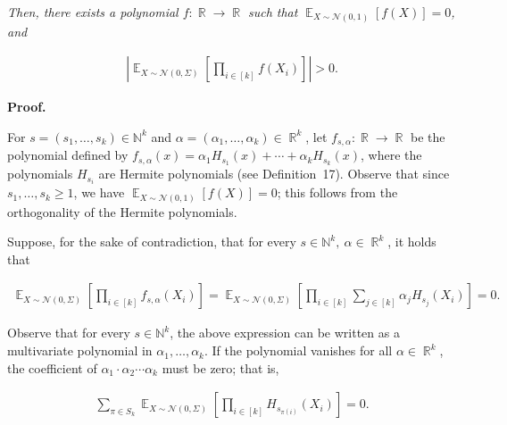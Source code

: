 \emph{Then, there exists a polynomial $f:\mathop{\mathbb{R}}\to\mathop{\mathbb{R}}$ such that $\mathop{\mathbb{E}}_{X\sim\mathcal{N}(0,1)}\left[f(X)\right]=0$, and}\par


\[\begin{gathered}
\left|\mathop{\mathbb{E}}_{X\sim\mathcal{N}(0,\Sigma)}\left[\prod_{i\in[k]}f(X_{i})\right]\right|>0.
\end{gathered}\]






\par\medskip\noindent\textbf{Proof.}\par




For $s=(s_{1},\dots,s_{k})\in\mathbb{N}^{k}$ and $\alpha=(\alpha_{1},\dots,\alpha_{k})\in\mathop{\mathbb{R}}^{k}$, let $f_{s,\alpha}:\mathop{\mathbb{R}}\to\mathop{\mathbb{R}}$ be the polynomial defined by $f_{s,\alpha}(x)=\alpha_{1}H_{s_{1}}(x)+\cdots+\alpha_{k}H_{s_{k}}(x)$, where the polynomials $H_{s_{i}}$ are Hermite polynomials (see Definition 17). Observe that since $s_{1},\dots,s_{k}\geqslant 1$, we have $\mathop{\mathbb{E}}_{X\sim\mathcal{N}(0,1)}\left[f(X)\right]=0$; this follows from the orthogonality of the Hermite polynomials.\par




Suppose, for the sake of contradiction, that for every $s\in\mathbb{N}^{k},\ \alpha\in\mathop{\mathbb{R}}^{k}$, it holds that\par


\[\begin{gathered}
\mathop{\mathbb{E}}_{X\sim\mathcal{N}(0,\Sigma)}\left[\prod_{i\in[k]}f_{s,\alpha}(X_{i})\right]=\mathop{\mathbb{E}}_{X\sim\mathcal{N}(0,\Sigma)}\left[\prod_{i\in[k]}\sum_{j\in[k]}\alpha_{j}H_{s_{j}}(X_{i})\right]=0.
\end{gathered}\]


Observe that for every $s\in\mathbb{N}^{k}$, the above expression can be written as a multivariate polynomial in $\alpha_{1},\dots,\alpha_{k}$.
If the polynomial vanishes for all $\alpha\in\mathop{\mathbb{R}}^{k}$, the coefficient of $\alpha_{1}\cdot\alpha_{2}\cdots\alpha_{k}$ must be zero; that is,\par


\[\begin{gathered}
\sum_{\pi\in S_{k}}\mathop{\mathbb{E}}_{X\sim\mathcal{N}(0,\Sigma)}\left[\prod_{i\in[k]}H_{s_{\pi(i)}}(X_{i})\right]=0.
\end{gathered}\]


